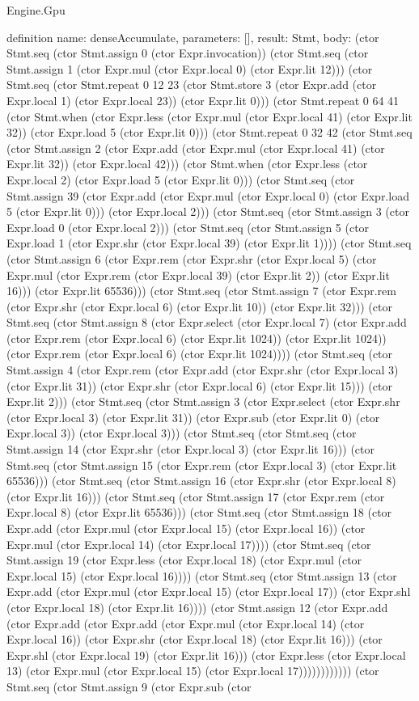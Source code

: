 \begin{lexlean}{Engine.Gpu}
\begin{semanticmodule}
definition{
  name: denseAccumulate,
  parameters: [],
  result: Stmt,
  body: (ctor Stmt.seq (ctor Stmt.assign 0 (ctor Expr.invocation)) (ctor Stmt.seq (ctor Stmt.assign 1 (ctor Expr.mul (ctor Expr.local 0) (ctor Expr.lit 12))) (ctor Stmt.seq (ctor Stmt.repeat 0 12 23 (ctor Stmt.store 3 (ctor Expr.add (ctor Expr.local 1) (ctor Expr.local 23)) (ctor Expr.lit 0))) (ctor Stmt.repeat 0 64 41 (ctor Stmt.when (ctor Expr.less (ctor Expr.mul (ctor Expr.local 41) (ctor Expr.lit 32)) (ctor Expr.load 5 (ctor Expr.lit 0))) (ctor Stmt.repeat 0 32 42 (ctor Stmt.seq (ctor Stmt.assign 2 (ctor Expr.add (ctor Expr.mul (ctor Expr.local 41) (ctor Expr.lit 32)) (ctor Expr.local 42))) (ctor Stmt.when (ctor Expr.less (ctor Expr.local 2) (ctor Expr.load 5 (ctor Expr.lit 0))) (ctor Stmt.seq (ctor Stmt.assign 39 (ctor Expr.add (ctor Expr.mul (ctor Expr.local 0) (ctor Expr.load 5 (ctor Expr.lit 0))) (ctor Expr.local 2))) (ctor Stmt.seq (ctor Stmt.assign 3 (ctor Expr.load 0 (ctor Expr.local 2))) (ctor Stmt.seq (ctor Stmt.assign 5 (ctor Expr.load 1 (ctor Expr.shr (ctor Expr.local 39) (ctor Expr.lit 1)))) (ctor Stmt.seq (ctor Stmt.assign 6 (ctor Expr.rem (ctor Expr.shr (ctor Expr.local 5) (ctor Expr.mul (ctor Expr.rem (ctor Expr.local 39) (ctor Expr.lit 2)) (ctor Expr.lit 16))) (ctor Expr.lit 65536))) (ctor Stmt.seq (ctor Stmt.assign 7 (ctor Expr.rem (ctor Expr.shr (ctor Expr.local 6) (ctor Expr.lit 10)) (ctor Expr.lit 32))) (ctor Stmt.seq (ctor Stmt.assign 8 (ctor Expr.select (ctor Expr.local 7) (ctor Expr.add (ctor Expr.rem (ctor Expr.local 6) (ctor Expr.lit 1024)) (ctor Expr.lit 1024)) (ctor Expr.rem (ctor Expr.local 6) (ctor Expr.lit 1024)))) (ctor Stmt.seq (ctor Stmt.assign 4 (ctor Expr.rem (ctor Expr.add (ctor Expr.shr (ctor Expr.local 3) (ctor Expr.lit 31)) (ctor Expr.shr (ctor Expr.local 6) (ctor Expr.lit 15))) (ctor Expr.lit 2))) (ctor Stmt.seq (ctor Stmt.assign 3 (ctor Expr.select (ctor Expr.shr (ctor Expr.local 3) (ctor Expr.lit 31)) (ctor Expr.sub (ctor Expr.lit 0) (ctor Expr.local 3)) (ctor Expr.local 3))) (ctor Stmt.seq (ctor Stmt.seq (ctor Stmt.assign 14 (ctor Expr.shr (ctor Expr.local 3) (ctor Expr.lit 16))) (ctor Stmt.seq (ctor Stmt.assign 15 (ctor Expr.rem (ctor Expr.local 3) (ctor Expr.lit 65536))) (ctor Stmt.seq (ctor Stmt.assign 16 (ctor Expr.shr (ctor Expr.local 8) (ctor Expr.lit 16))) (ctor Stmt.seq (ctor Stmt.assign 17 (ctor Expr.rem (ctor Expr.local 8) (ctor Expr.lit 65536))) (ctor Stmt.seq (ctor Stmt.assign 18 (ctor Expr.add (ctor Expr.mul (ctor Expr.local 15) (ctor Expr.local 16)) (ctor Expr.mul (ctor Expr.local 14) (ctor Expr.local 17)))) (ctor Stmt.seq (ctor Stmt.assign 19 (ctor Expr.less (ctor Expr.local 18) (ctor Expr.mul (ctor Expr.local 15) (ctor Expr.local 16)))) (ctor Stmt.seq (ctor Stmt.assign 13 (ctor Expr.add (ctor Expr.mul (ctor Expr.local 15) (ctor Expr.local 17)) (ctor Expr.shl (ctor Expr.local 18) (ctor Expr.lit 16)))) (ctor Stmt.assign 12 (ctor Expr.add (ctor Expr.add (ctor Expr.add (ctor Expr.mul (ctor Expr.local 14) (ctor Expr.local 16)) (ctor Expr.shr (ctor Expr.local 18) (ctor Expr.lit 16))) (ctor Expr.shl (ctor Expr.local 19) (ctor Expr.lit 16))) (ctor Expr.less (ctor Expr.local 13) (ctor Expr.mul (ctor Expr.local 15) (ctor Expr.local 17)))))))))))) (ctor Stmt.seq (ctor Stmt.assign 9 (ctor Expr.sub (ctor }
\end{semanticmodule}
\end{lexlean}
